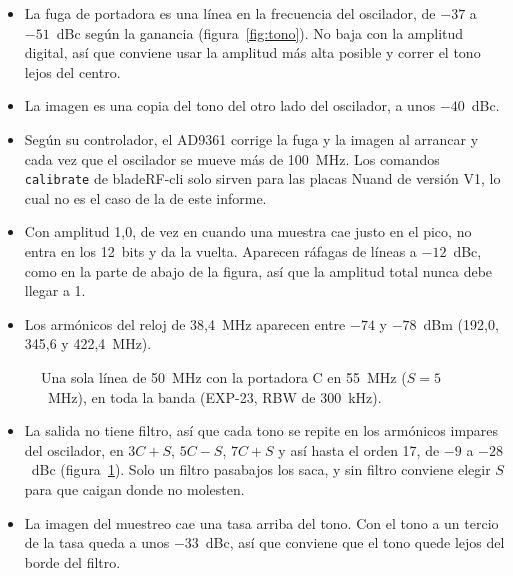 \documentclass[11pt,a4paper]{article}
\begin{document}
\begin{itemize}
  \item La fuga de portadora es una línea en la frecuencia del oscilador, de $-37$ a $-51$~dBc según la ganancia (figura~\ref{fig:tono}). No baja con la amplitud digital, así que conviene usar la amplitud más alta posible y correr el tono lejos del centro.
  \item La imagen es una copia del tono del otro lado del oscilador, a unos $-40$~dBc.
  \item Según su controlador, el AD9361 corrige la fuga y la imagen al arrancar y cada vez que el oscilador se mueve más de 100~MHz. Los comandos \texttt{calibrate} de bladeRF-cli solo sirven para las placas Nuand de versión V1, lo cual no es el caso de la de este informe.
  \item Con amplitud 1,0, de vez en cuando una muestra cae justo en el pico, no entra en los 12~bits y da la vuelta. Aparecen ráfagas de líneas a $-12$~dBc, como en la parte de abajo de la figura, así que la amplitud total nunca debe llegar a 1.
  \item Los armónicos del reloj de 38,4~MHz aparecen entre $-74$ y $-78$~dBm (192,0, 345,6 y 422,4~MHz).
\end{itemize}

\begin{figure}[H]
  \centering
  \caption{Una sola línea de 50~MHz con la portadora C en 55~MHz ($S = 5$~MHz), en toda la banda (EXP-23, RBW de 300~kHz).}
  \label{fig:armonicos}
\end{figure}

\begin{itemize}
  \item La salida no tiene filtro, así que cada tono se repite en los armónicos impares del oscilador, en $3C+S$, $5C-S$, $7C+S$ y así hasta el orden 17, de $-9$ a $-28$~dBc (figura~\ref{fig:armonicos}). Solo un filtro pasabajos los saca, y sin filtro conviene elegir $S$ para que caigan donde no molesten.
  \item La imagen del muestreo cae una tasa arriba del tono. Con el tono a un tercio de la tasa queda a unos $-33$~dBc, así que conviene que el tono quede lejos del borde del filtro.
\end{itemize}
\end{document}
